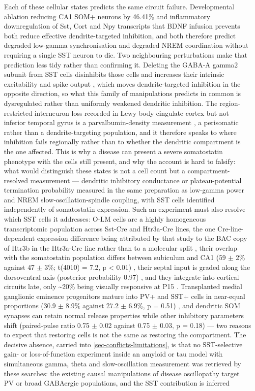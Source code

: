 \documentclass[11pt]{article}
\begin{document}
Each of these cellular states predicts the same circuit failure. Developmental ablation reducing CA1 SOM+ neurons by 46.41\% \citep{Subramanian2024} and inflammatory downregulation of Sst, Cort and Npy transcripts that BDNF infusion prevents \citep{Rezaei2025} both reduce effective dendrite-targeted inhibition, and both therefore predict degraded low-gamma synchronisation and degraded NREM coordination without requiring a single SST neuron to die. Two neighbouring perturbations make that prediction less tidy rather than confirming it. Deleting the GABA-A gamma2 subunit from SST cells disinhibits those cells and increases their intrinsic excitability and spike output \citep{Fuchs2016}, which moves dendrite-targeted inhibition in the opposite direction, so what this family of manipulations predicts in common is dysregulated rather than uniformly weakened dendritic inhibition. The region-restricted interneuron loss recorded in Lewy body cingulate cortex but not inferior temporal gyrus is a parvalbumin-density measurement \citep{Hawksworth2026}, a perisomatic rather than a dendrite-targeting population, and it therefore speaks to where inhibition fails regionally rather than to whether the dendritic compartment is the one affected. This is why a disease can present a severe somatostatin phenotype with the cells still present, and why the account is hard to falsify: what would distinguish these states is not a cell count but a compartment-resolved measurement --- dendritic inhibitory conductance or plateau-potential termination probability measured in the same preparation as low-gamma power and NREM slow-oscillation-spindle coupling, with SST cells identified independently of somatostatin expression. Such an experiment must also resolve which SST cells it addresses: O-LM cells are a highly homogeneous transcriptomic population across Sst-Cre and Htr3a-Cre lines, the one Cre-line-dependent expression difference being attributed by that study to the BAC copy of Htr3b in the Htr3a-Cre line rather than to a molecular split \citep{Winterer2019}, their overlap with the somatostatin population differs between subiculum and CA1 (59 $\pm$ 2\% against 47 $\pm$ 3\%; t(4010) = 7.2, p < 0.01) \citep{Nichol2018}, their septal input is graded along the dorsoventral axis (posterior probability 0.97) \citep{Thulin2025}, and they integrate into cortical circuits late, only \textasciitilde{}20\% being visually responsive at P15 \citep{Wang2025b}. Transplanted medial ganglionic eminence progenitors mature into PV+ and SST+ cells in near-equal proportions (30.9 $\pm$ 8.9\% against 27.2 $\pm$ 6.9\%, p = 0.51) \citep{Yokomizo2025a}, and dendritic SOM synapses can retain normal release properties while other inhibitory parameters shift (paired-pulse ratio 0.75 $\pm$ 0.02 against 0.75 $\pm$ 0.03, p = 0.18) \citep{Gutmann2026} --- two reasons to expect that restoring cells is not the same as restoring the compartment. The decisive absence, carried into \ref{sec-conflicts-limitations}, is that no SST-selective gain- or loss-of-function experiment inside an amyloid or tau model with simultaneous gamma, theta and slow-oscillation measurement was retrieved by these searches: the existing causal manipulations of disease oscillopathy target PV or broad GABAergic populations, and the SST contribution is inferred 
\end{document}
